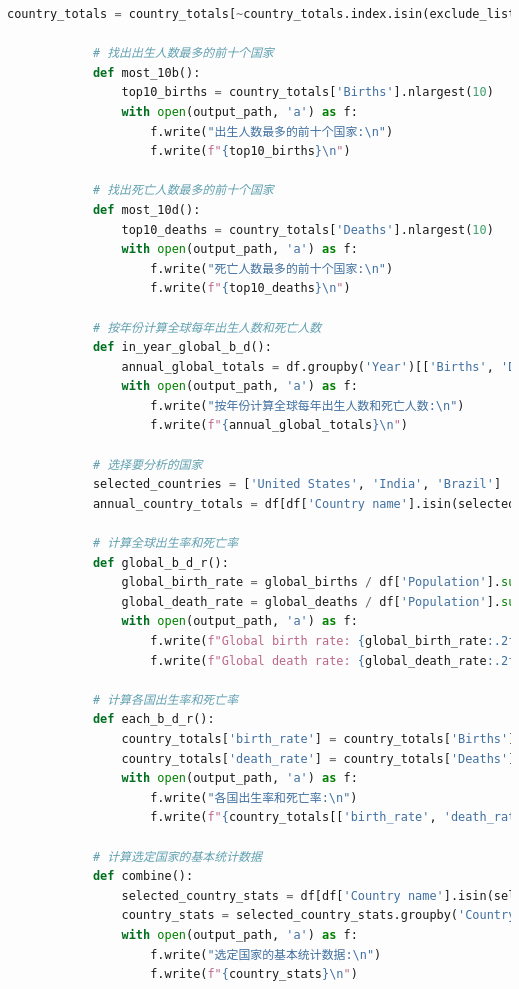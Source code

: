 \documentclass{ctexart}
\begin{document}
\begin{lstlisting}[language=Python]
            country_totals = country_totals[~country_totals.index.isin(exclude_list)]

            # 找出出生人数最多的前十个国家
            def most_10b():
                top10_births = country_totals['Births'].nlargest(10)
                with open(output_path, 'a') as f:
                    f.write("出生人数最多的前十个国家:\n")
                    f.write(f"{top10_births}\n")

            # 找出死亡人数最多的前十个国家
            def most_10d():
                top10_deaths = country_totals['Deaths'].nlargest(10)
                with open(output_path, 'a') as f:
                    f.write("死亡人数最多的前十个国家:\n")
                    f.write(f"{top10_deaths}\n")

            # 按年份计算全球每年出生人数和死亡人数
            def in_year_global_b_d():
                annual_global_totals = df.groupby('Year')[['Births', 'Deaths']].sum()
                with open(output_path, 'a') as f:
                    f.write("按年份计算全球每年出生人数和死亡人数:\n")
                    f.write(f"{annual_global_totals}\n")

            # 选择要分析的国家
            selected_countries = ['United States', 'India', 'Brazil']
            annual_country_totals = df[df['Country name'].isin(selected_countries)].groupby(['Year', 'Country name'])[['Births', 'Deaths']].sum().reset_index()

            # 计算全球出生率和死亡率
            def global_b_d_r():
                global_birth_rate = global_births / df['Population'].sum() * 1000
                global_death_rate = global_deaths / df['Population'].sum() * 1000
                with open(output_path, 'a') as f:
                    f.write(f"Global birth rate: {global_birth_rate:.2f} per 1000 people\n")
                    f.write(f"Global death rate: {global_death_rate:.2f} per 1000 people\n")

            # 计算各国出生率和死亡率
            def each_b_d_r():
                country_totals['birth_rate'] = country_totals['Births'] / country_totals['Population'] * 1000
                country_totals['death_rate'] = country_totals['Deaths'] / country_totals['Population'] * 1000
                with open(output_path, 'a') as f:
                    f.write("各国出生率和死亡率:\n")
                    f.write(f"{country_totals[['birth_rate', 'death_rate']]}\n")

            # 计算选定国家的基本统计数据
            def combine():
                selected_country_stats = df[df['Country name'].isin(selected_countries)]
                country_stats = selected_country_stats.groupby('Country name')[['Births', 'Deaths']].agg(['mean', 'median', 'var'])
                with open(output_path, 'a') as f:
                    f.write("选定国家的基本统计数据:\n")
                    f.write(f"{country_stats}\n")


        \end{lstlisting}
    \newpage
\end{document}
